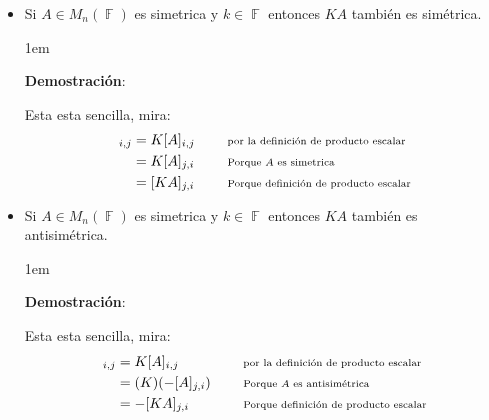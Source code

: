 \documentclass[12pt, fleqn]{report}                             %
\newenvironment{SmallIndentation}[1][0.75em]                    %
        {\begin{adjustwidth}{#1}{}\begin{footnotesize}}             %
        {\end{footnotesize}\end{adjustwidth}}                       %
\DeclareMathOperator \Space     {\quad}                         %
\newcommand \Remember[1]    {\Space\text{\scriptsize{#1}}}      %
\theoremstyle{break}                                            %
\DeclareMathOperator \GenericField {\mathbb{F}}                 %
\begin{document}
\begin{itemize}
\begin{SmallIndentation}[1em]
                            \end{SmallIndentation}

                        \item Si $A \in M_{n}(\GenericField)$ es simetrica y $k \in \GenericField$ entonces 
                            $KA$ también es simétrica.

                            \begin{SmallIndentation}[1em]
                                \textbf{Demostración}:

                                Esta esta sencilla, mira:
                                \begin{align*}
                                    [KA]_{i, j}
                                        &= K [A]_{i, j}     
                                            && \Remember{por la definición de producto escalar} \\
                                        &= K [A]_{j, i}
                                            && \Remember{Porque $A$ es simetrica}               \\
                                        &= [KA]_{j, i}
                                            && \Remember{Porque definición de producto escalar}
                                \end{align*}

                            \end{SmallIndentation}

                        \item Si $A \in M_{n}(\GenericField)$ es simetrica y $k \in \GenericField$ entonces 
                            $KA$ también es antisimétrica.

                            \begin{SmallIndentation}[1em]
                                \textbf{Demostración}:

                                Esta esta sencilla, mira:
                                \begin{align*}
                                    [KA]_{i, j}
                                        &= K [A]_{i, j}     
                                            && \Remember{por la definición de producto escalar} \\
                                        &= (K)(-[A]_{j, i})
                                            && \Remember{Porque $A$ es antisimétrica}           \\
                                        &= -[KA]_{j, i}
                                            && \Remember{Porque definición de producto escalar}
                                \end{align*}


\end{SmallIndentation}
\end{itemize}
\end{document}
